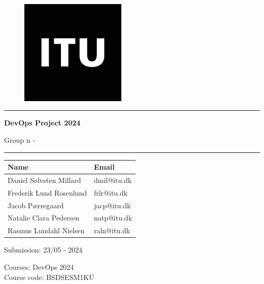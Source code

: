 \begin{titlepage}
\begin{center}
\newcommand{\quickcharcount}[1]{%
  \immediate\write18{texcount -1 -sum -merge -char -q #1.tex output.bbl > #1-chars.sum }%
}
\vspace{1cm}
\begin{figure}
        \centering
        \includegraphics[width=0.45\textwidth]{Images/itu_logo.png} %
\end{figure}

\vspace{1cm}

\hrule
\vspace{.5cm}
{\huge \bfseries DevOps Project 2024 
\vspace{.25cm}

Group n - \titleDocument}
\vspace{.5cm}

\hrule
\vspace{1cm}

\centering

\begin{center}
\setlength{\tabcolsep}{30pt}
\renewcommand{\arraystretch}{1.2}
\begin{tabular}{ll}
    \Large{Name} & \Large{Email} \\\hline
    Daniel Sølvsten Millard & dmil@itu.dk \\
    Frederik Lund Rosenlund & frlr@itu.dk \\
    Jacob Pærregaard & jacp@itu.dk \\
    Natalie Clara Pedersen & natp@itu.dk \\
    Rasmus Lundahl Nielsen & raln@itu.dk \\
\end{tabular}
\end{center}

\vspace{1.5cm}

Submission: 23/05 - 2024 %

\vspace{.5cm} 

Courses: DevOps 2024 \\
Course code: BSDSESM1KU \\
\vspace{.5cm}

\end{center}
\end{titlepage}

